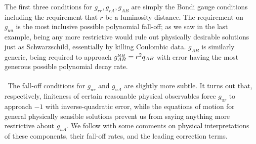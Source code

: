 \documentclass[11pt,letterpaper]{article}
\begin{document}
The first three conditions for $g_{rr}, g_{rA}, g_{AB}$ are simply the Bondi gauge conditions including the requirement that $r$ be a luminosity distance. The requirement on $g_{uu}$ is the most inclusive possible polynomial fall-off; as we saw in the last example, being any more restrictive would rule out physically desirable solutions just as Schwarzschild, essentially by killing Coulombic data. $g_{AB}$ is similarly generic, being required to approach $g_{AB}^{\mbox{\tiny{MB}}} = r^2 q_{AB}$ with error having the most generous possible polynomial decay rate.\\
\\
\
The fall-off conditions for $g_{ur}$ and $g_{uA}$ are slightly more subtle. It turns out that, respectively, finiteness of certain reasonable physical observables force $g_{ur}$ to approach $-1$ with inverse-quadratic error, while the equations of motion for general physically sensible solutions prevent us from saying anything more restrictive about $g_{uA}$. We follow with some comments on physical interpretations of these components, their fall-off rates, and the leading correction terms.
\end{document}
